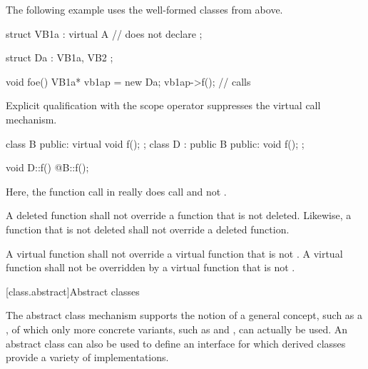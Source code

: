 \pnum
\begin{example}
The following example uses the well-formed classes from above.
\begin{codeblock}
struct VB1a : virtual A {       // does not declare 
};

struct Da : VB1a, VB2 {
};

void foe() {
  VB1a*  vb1ap = new Da;
  vb1ap->f();                   // calls 
}
\end{codeblock}
\end{example}

\pnum
{}%
%
Explicit qualification with the scope operator
suppresses the virtual call mechanism.
\begin{example}
\begin{codeblock}
class B { public: virtual void f(); };
class D : public B { public: void f(); };

void D::f() { @\commentellip@ B::f(); }
\end{codeblock}

Here, the function call in
really does call
and not
.
\end{example}

\pnum
A deleted function shall
not override a function that is not deleted. Likewise,
a function that is not deleted shall not override a
deleted function.%

\pnum
A  virtual function shall not override
a virtual function that is not .
A  virtual function shall not be overridden by
a virtual function that is not .

[class.abstract]{Abstract classes}%

\pnum
\begin{note}
The abstract class mechanism supports the notion of a general concept,
such as a , of which only more concrete variants, such as
 and , can actually be used. An abstract
class can also be used to define an interface for which derived classes
provide a variety of implementations.
\end{note}

